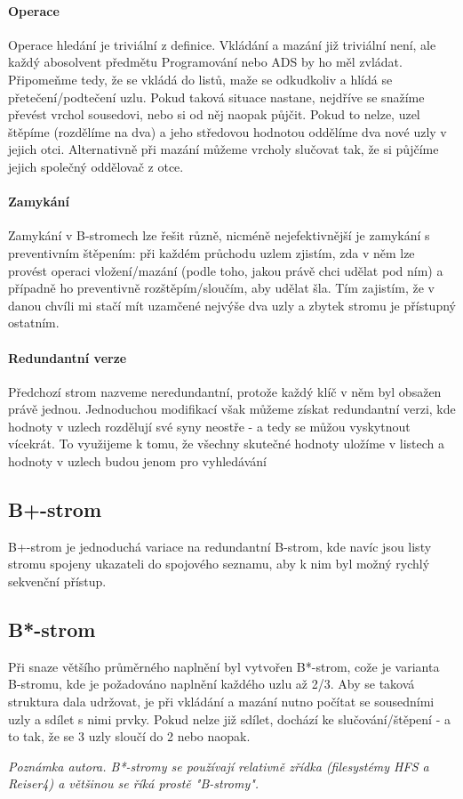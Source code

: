 \documentclass[a4paper,12pt]{article}
\begin{document}
\paragraph{Operace}
Operace hledání je triviální z definice. Vkládání a mazání již triviální není, 
ale každý abosolvent předmětu Programování nebo ADS by ho měl zvládat.  
Připomeňme tedy, že se vkládá do listů, maže se odkudkoliv a hlídá se 
přetečení/podtečení uzlu. Pokud taková situace nastane, nejdříve se snažíme 
převést vrchol sousedovi, nebo si od něj naopak půjčit. Pokud to nelze, uzel 
štěpíme (rozdělíme na dva) a jeho středovou hodnotou oddělíme dva nové uzly v 
jejich otci. Alternativně při mazání můžeme vrcholy slučovat tak, že si půjčíme 
jejich společný oddělovač z otce.

\paragraph{Zamykání}
Zamykání v B-stromech lze řešit různě, nicméně nejefektivnější je zamykání s 
preventivním štěpením: při každém průchodu uzlem zjistím, zda v něm lze provést 
operaci vložení/mazání (podle toho, jakou právě chci udělat pod ním) a případně 
ho preventivně rozštěpím/sloučím, aby udělat šla. Tím zajistím, že v danou 
chvíli mi stačí mít uzamčené nejvýše dva uzly a zbytek stromu je přístupný 
ostatním.

\paragraph{Redundantní verze}
Předchozí strom nazveme neredundantní, protože každý klíč v něm byl obsažen 
právě jednou. Jednoduchou modifikací však můžeme získat redundantní verzi, kde 
hodnoty v uzlech rozdělují své syny neostře - a tedy se můžou vyskytnout 
vícekrát. To využijeme k tomu, že všechny skutečné hodnoty uložíme v listech a 
hodnoty v uzlech budou jenom pro vyhledávání

\subsection{B+-strom}
\setcounter{equation}{0}
B+-strom je jednoduchá variace na redundantní B-strom, kde navíc jsou listy 
stromu spojeny ukazateli do spojového seznamu, aby  k nim byl možný rychlý 
sekvenční přístup.

\subsection{B*-strom}
\setcounter{equation}{0}
Při snaze většího průměrného naplnění byl vytvořen B*-strom, cože je varianta 
B-stromu, kde je požadováno naplnění každého uzlu až 2/3. Aby se taková 
struktura dala udržovat, je při vkládání a mazání nutno počítat se sousedními 
uzly a sdílet s nimi prvky. Pokud nelze již sdílet, dochází ke slučování/štěpení 
- a to tak, že se 3 uzly sloučí do 2 nebo naopak.

\textit{Poznámka autora. B*-stromy se používají relativně zřídka (filesystémy 
HFS a Reiser4) a většinou se říká prostě "B-stromy".}
\end{document}
